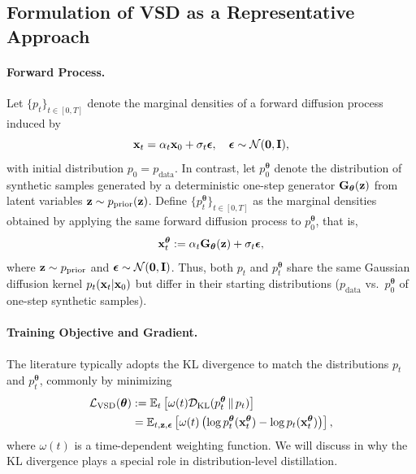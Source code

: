 \subsection{Formulation of VSD as a Representative Approach}
\paragraph{Forward Process.}
Let $\{p_t\}_{t \in [0,T]}$ denote the marginal densities of a forward diffusion process induced by
\[
{\mathbf{x}}_t = \alpha_t {\mathbf{x}}_0 + \sigma_t \bm{\epsilon}, \quad \bm{\epsilon} \sim \mathcal{N}(\bm{0}, {\mathbf{I}}),
\]
with initial distribution $p_0 = p_{\mathrm{data}}$.  
In contrast, let $p_0^{\bm{\theta}}$ denote the distribution of synthetic samples generated by a deterministic one-step generator ${\mathbf{G}}_{\bm{\theta}}({\mathbf{z}})$ from latent variables ${\mathbf{z}} \sim p_{\mathrm{prior}}({\mathbf{z}})$. Define $\{p_t^{\bm{\theta}}\}_{t \in [0,T]}$ as the marginal densities obtained by applying the same forward diffusion process to $p_0^{\bm{\theta}}$, that is,
\begin{align}\label{eq:vsd-forward}
    {\mathbf{x}}_t^{\bm{\theta}} := \alpha_t {\mathbf{G}}_{\bm{\theta}}({\mathbf{z}}) + \sigma_t \bm{\epsilon}, 
\end{align}
where ${\mathbf{z}} \sim p_{\mathrm{prior}}$ and $ \bm{\epsilon} \sim \mathcal{N}(\bm{0}, {\mathbf{I}})$. Thus, both $p_t$ and $p_t^{\bm{\theta}}$ share the same Gaussian diffusion kernel 
$p_t({\mathbf{x}}_t| {\mathbf{x}}_0)$ but differ in their starting distributions 
($p_{\mathrm{data}}$ vs.\ $p_0^{\bm{\theta}}$ of one-step synthetic samples).

\paragraph{Training Objective and Gradient.}
The literature typically adopts the KL divergence to match the distributions $p_t$ and $p_t^{\bm{\theta}}$, commonly by minimizing
\begin{align*}
    \mathcal{L}_{\text{VSD}}(\bm{\theta}) &:=\mathbb{E}_t \left[ \omega(t)  \mathcal{D}_{\text{KL}}(p_t^{\bm{\theta}} \, \| \, p_t) \right]
\\&= \mathbb{E}_{t, {\mathbf{z}}, \bm{\epsilon}} \left[ \omega(t) \left( \log p_t^{\bm{\theta}}({\mathbf{x}}_t^{\bm{\theta}}) - \log p_t({\mathbf{x}}_t^{\bm{\theta}}) \right) \right],
\end{align*}
where $\omega(t)$ is a time-dependent weighting function. We will discuss in  why the KL divergence plays a
special role in distribution-level distillation.



